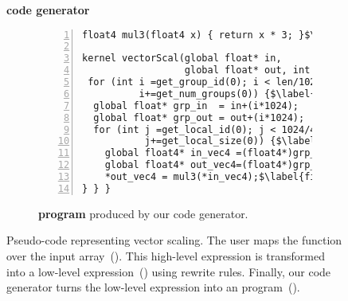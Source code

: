 \begin{figure}[b]
\begin{minipage}{0.1\linewidth}
\vspace{0pt}
\centering
{}
\end{minipage}
\begin{minipage}{0.26\linewidth}
\vspace{-5pt}
\centering
\textbf{code generator}
\end{minipage}
\begin{minipage}{0.1\linewidth}
\vspace{0pt}
\centering
{}
\end{minipage}

\begin{subfigure}[b]{\linewidth}
\centering
\begin{minipage}{.85\textwidth}
\begin{lstlisting}[mathescape,numbers=left]
float4 mul3(float4 x) { return x * 3; }$\label{fig:codeex:ocl:def}$

kernel vectorScal(global float* in,
                  global float* out, int len) {
 for (int i =get_group_id(0); i < len/1024;$\label{fig:codeex:ocl:loop1:start}$
          i+=get_num_groups(0)) {$\label{fig:codeex:ocl:loop1:end}$
  global float* grp_in  = in+(i*1024);
  global float* grp_out = out+(i*1024);
  for (int j =get_local_id(0); j < 1024/4;$\label{fig:codeex:ocl:loop2:start}$
           j+=get_local_size(0)) {$\label{fig:codeex:ocl:loop2:end}$
    global float4* in_vec4 =(float4*)grp_in+(j*4);
    global float4* out_vec4=(float4*)grp_out+(j*4);
    *out_vec4 = mul3(*in_vec4);$\label{fig:codeex:ocl:call}$
} } }  
\end{lstlisting}
\end{minipage}
\caption{\textbf{\OpenCL program} produced by our code generator.}
\label{fig:codeex:ocl}
\end{subfigure}
\caption[Introductory example: vector scaling.]{
Pseudo-code representing vector scaling.
The user maps the  function over the input array~().
This high-level expression is transformed into a low-level expression~() using rewrite rules.
Finally, our code generator turns the low-level expression into an \OpenCL program~().
}
  \label{fig:codeex}
\end{figure}

